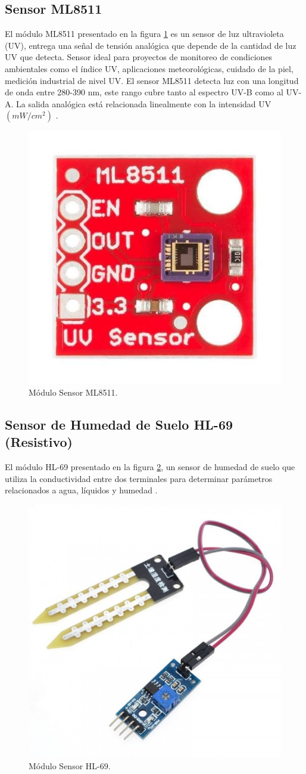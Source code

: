 \subsection{Sensor ML8511}
El módulo ML8511 presentado en la figura \ref{fig:SensorML8511} es un sensor de luz ultravioleta (UV), entrega una señal de tensión analógica que depende de la cantidad de luz UV que detecta. Sensor ideal para proyectos de monitoreo de condiciones ambientales como el índice UV, aplicaciones meteorológicas, cuidado de la piel, medición industrial de nivel UV.
El sensor ML8511 detecta luz con una longitud de onda entre 280-390 nm, este rango cubre tanto al espectro UV-B como al UV-A. La salida analógica está relacionada linealmente con la intensidad UV $(mW/cm^2)$ \citep{ModuloML8511}.
\begin{figure}[htbp]
	\centering
	\includegraphics[width=.3\textwidth]{./Figures/ml8511.jpg}
	\caption{Módulo Sensor ML8511.}
	\label{fig:SensorML8511}
\end{figure}
\subsection{Sensor de Humedad de Suelo HL-69 (Resistivo)}
El módulo HL-69 presentado en la figura \ref{fig:SensorHL-69}, un sensor de humedad de suelo que utiliza la conductividad entre dos terminales para determinar parámetros relacionados a agua, líquidos y humedad \citep{ModuloHL-69}.
\begin{figure}[htbp]
	\centering
	\includegraphics[width=.4\textwidth]{./Figures/sensordehumedad.jpg}
	\caption{Módulo Sensor HL-69.}
	\label{fig:SensorHL-69}
\end{figure}

